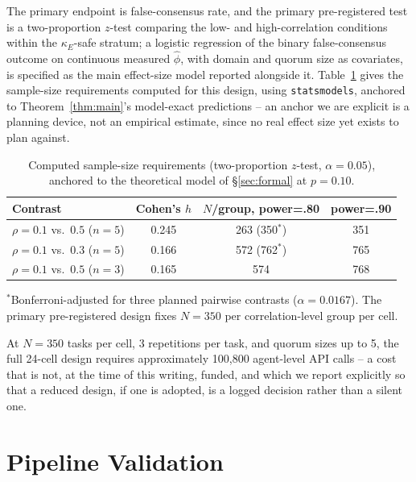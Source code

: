 \documentclass[journal]{IEEEtran}
\begin{document}
The primary endpoint is false-consensus rate, and the primary pre-registered test is a two-proportion $z$-test comparing the low- and high-correlation conditions within the $\kappa_E$-safe stratum; a logistic regression of the binary false-consensus outcome on continuous measured $\hat\phi$, with domain and quorum size as covariates, is specified as the main effect-size model reported alongside it. Table~\ref{tab:power} gives the sample-size requirements computed for this design, using \texttt{statsmodels}, anchored to Theorem~\ref{thm:main}'s model-exact predictions -- an anchor we are explicit is a planning device, not an empirical estimate, since no real effect size yet exists to plan against.

\begin{table}[t]
\centering
\caption{Computed sample-size requirements (two-proportion $z$-test, $\alpha=0.05$), anchored to the theoretical model of \S\ref{sec:formal} at $p=0.10$.}
\label{tab:power}
\small
\begin{tabular}{@{}lccc@{}}
\toprule
\textbf{Contrast} & \textbf{Cohen's $h$} & \textbf{$N$/group, power=.80} & \textbf{power=.90} \\
\midrule
$\rho{=}0.1$ vs.\ $0.5$ ($n{=}5$) & 0.245 & 263 (350$^{\ast}$) & 351 \\
$\rho{=}0.1$ vs.\ $0.3$ ($n{=}5$) & 0.166 & 572 (762$^{\ast}$) & 765 \\
$\rho{=}0.1$ vs.\ $0.5$ ($n{=}3$) & 0.165 & 574 & 768 \\
\bottomrule
\end{tabular}

\vspace{2pt}
\footnotesize $^{\ast}$Bonferroni-adjusted for three planned pairwise contrasts ($\alpha=0.0167$). The primary pre-registered design fixes $N=350$ per correlation-level group per cell.
\end{table}

At $N=350$ tasks per cell, 3 repetitions per task, and quorum sizes up to 5, the full 24-cell design requires approximately 100{,}800 agent-level API calls -- a cost that is not, at the time of this writing, funded, and which we report explicitly so that a reduced design, if one is adopted, is a logged decision rather than a silent one.

\section{Pipeline Validation}
\label{sec:validation}
\end{document}
